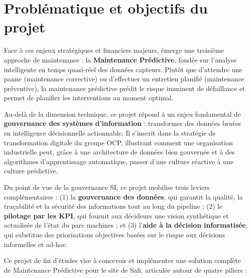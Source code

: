 \documentclass[a4paper,12pt]{report}
\begin{document}
\section*{Problématique et objectifs du projet}

Face à ces enjeux stratégiques et financiers majeurs, émerge une troisième approche de maintenance : la \textbf{Maintenance Prédictive}, fondée sur l'analyse intelligente en temps quasi-réel des données capteurs. Plutôt que d'attendre une panne (maintenance corrective) ou d'effectuer un entretien planifié (maintenance préventive), la maintenance prédictive prédit le risque imminent de défaillance et permet de planifier les interventions au moment optimal.

Au-delà de la dimension technique, ce projet répond à un enjeu fondamental de \textbf{gouvernance des systèmes d'information} : transformer des données brutes en intelligence décisionnelle actionnable. Il s'inscrit dans la stratégie de transformation digitale du groupe OCP, illustrant comment une organisation industrielle peut, grâce à une architecture de données bien gouvernée et à des algorithmes d'apprentissage automatique, passer d'une culture réactive à une culture prédictive.

Du point de vue de la gouvernance SI, ce projet mobilise trois leviers complémentaires : (1) la \textbf{gouvernance des données}, qui garantit la qualité, la traçabilité et la sécurité des informations tout au long du pipeline ; (2) le \textbf{pilotage par les KPI}, qui fournit aux décideurs une vision synthétique et actualisée de l'état du parc machines ; et (3) l'\textbf{aide à la décision informatisée}, qui substitue des priorisations objectives basées sur le risque aux décisions informelles et ad-hoc.

Ce projet de fin d'études vise à concevoir et implémenter une solution complète de Maintenance Prédictive pour le site de Safi, articulée autour de quatre piliers :
\end{document}

